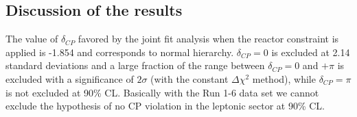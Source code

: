 
%



%
%

\subsection {Discussion of the results}
\label{sec:results_discussion}

The value of $\delta_{CP}$ favored by the joint fit analysis when the reactor constraint is applied 
is -1.854 and corresponds to normal hierarchy.
$\delta_{CP} = 0$ is excluded at 2.14 standard deviations and a large fraction of the range between $\delta_{CP} = 0$ and $+\pi$
is excluded with a significance of $2 \sigma$ (with the constant $\Delta \chi^2$ method),
while $\delta_{CP} = \pi$ is not excluded at 90\% CL.
Basically with the Run 1-6 data set we cannot exclude the hypothesis of no CP violation in the leptonic sector at 90\% CL.

